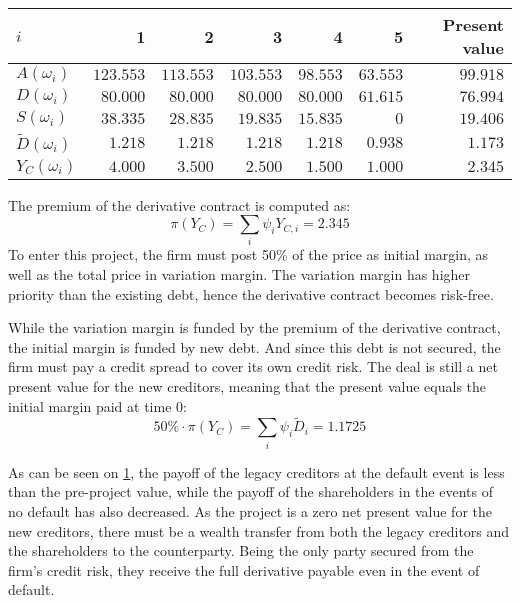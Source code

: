 \documentclass[../main.tex]{subfiles}
\begin{document}
        \begin{table}[H]
            \centering
            \begin{tabular}{l|rrrrr||r}
                $i$ & 1 & 2 & 3 & 4 & 5 & Present value \\
                \hline
                $A(\omega_{i})$ & $123.553$ & $113.553$ & $103.553$ & $98.553$ & $63.553$ & $99.918$ \\
                $D(\omega_{i})$ & $80.000$ & $80.000$ & $80.000$ & $80.000$ & $61.615$ & $76.994$ \\
                $S(\omega_{i})$ & $38.335$ & $28.835$ & $19.835$ & $15.835$ & $0$ & $19.406$ \\
                $\tilde{D}(\omega_{i})$ & $1.218$ & $1.218$ & $1.218$ & $1.218$ & $0.938$ & $1.173$ \\
                $Y_C(\omega_{i})$ & $4.000$ & $3.500$ & $2.500$ & $1.500$ & $1.000$ & $2.345$ \\
            \end{tabular}
            \caption{}
            \label{tbl:example-collateralized-derivative}
        \end{table}

        The premium of the derivative contract is computed as:
        \begin{equation}
            \pi(Y_C) = \sum_i \psi_i Y_{C,i} = 2.345
        \end{equation}
        To enter this project, the firm must post 50\% of the price as initial margin, as well as the total price in variation margin.
        The variation margin has higher priority than the existing debt, hence the derivative contract becomes risk-free.

        While the variation margin is funded by the premium of the derivative contract, the initial margin is funded by new debt. And since this debt is not secured, the firm must pay a credit spread to cover its own credit risk. The deal is still a net present value for the new creditors, meaning that the present value equals the initial margin paid at time 0:
        \begin{equation}
            50\% \cdot \pi(Y_C) = \sum_i \psi_i \tilde{D}_{i} = 1.1725
        \end{equation}

        As can be seen on \cref{tbl:example-collateralized-derivative}, the payoff of the legacy creditors at the default event is less than the pre-project value, while the payoff of the shareholders in the events of no default has also decreased. As the project is a zero net present value for the new creditors, there must be a wealth transfer from both the legacy creditors and the shareholders to the counterparty. Being the only party secured from the firm's credit risk, they receive the full derivative payable even in the event of default.
\end{document}
